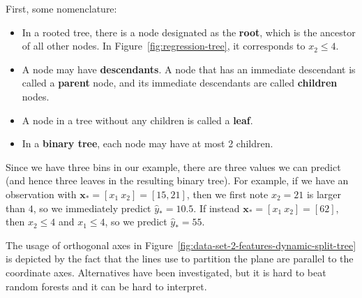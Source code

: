 \documentclass[12pt, a4paper]{article}
\theoremstyle{definition}
\begin{document}
	First, some nomenclature:
	\begin{itemize}
		\item In a rooted tree, there is a node designated as the \textbf{root},
		which is the ancestor of all other nodes. In Figure~\ref{fig:regression-tree},
		it corresponds to $x_2 \leq 4$.
		\item A node may have \textbf{descendants}. A node that has an immediate
		descendant is called a \textbf{parent} node, and its immediate descendants
		are called \textbf{children} nodes.
		\item A node in a tree without any children is called a \textbf{leaf}.
		\item In a \textbf{binary tree}, each node may have at most 2 children.
	\end{itemize}
	Since we have three bins in our example, there are three values we can predict
	(and hence three leaves in the resulting binary tree). For example,
	if we have an observation with $\bm{x}_* = [x_1 \ x_2] = [15, 21]$, then we first
	note $x_2=21$ is larger than $4$, so we immediately predict $\hat{y}_* = 10.5$.
	If instead $\bm{x}_* = [x_1 \  x_2] = [6 2]$, then $x_2\leq 4$ and $x_1\leq 4$,
	so we predict $\hat{y}_* = 55$.
	
	The usage of orthogonal axes in Figure~\ref{fig:data-set-2-features-dynamic-split-tree}
	is depicted by the fact that the lines use to partition the plane are parallel
	to the coordinate axes. Alternatives have been investigated, but it is hard
	to beat random forests and it can be hard to interpret.
	
\end{document}
